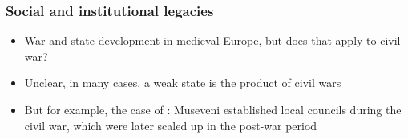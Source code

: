 \documentclass[aspectratio=43]{beamer}
\begin{document}
\begin{frame}
\frametitle{Social and institutional legacies}
\centering

\begin{itemize}[<+->]
  \item War and state development in medieval Europe, but does that apply to civil war?
  \item Unclear, in many cases, a weak state is the product of civil wars
  \item But for example, the case of {\color{red}{Uganda}}: Museveni established local councils during the civil war, which were later scaled up in the post-war period
\end{itemize}

\end{frame}






\end{document}
